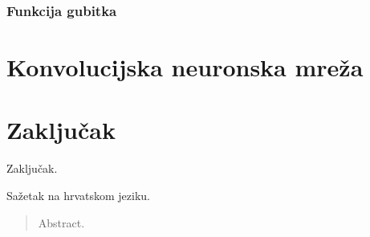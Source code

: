 \documentclass[times, utf8, zavrsni, numeric]{fer}
\begin{document}
\subsection{Funkcija gubitka}


\chapter{Konvolucijska neuronska mreža}

\chapter{Zaključak}
Zaključak.



\nocite{Cupic-UNN}
\nocite{Goodfellow-et-al-2016}


\begin{sazetak}
Sažetak na hrvatskom jeziku.

\end{sazetak}

\begin{abstract}
Abstract.

\end{abstract}
\end{document}
